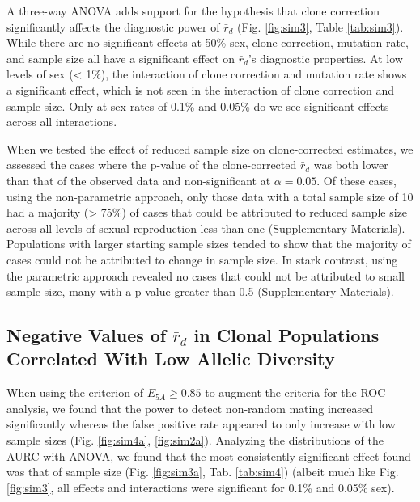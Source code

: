 \documentclass[]{article}
\theoremstyle{definition}
\theoremstyle{definition}
\theoremstyle{remark}
\begin{document}
A three-way ANOVA adds support for the hypothesis that clone correction
significantly affects the diagnostic power of \(\bar{r}_d\) (Fig.
\ref{fig:sim3}, Table \ref{tab:sim3}). While there are no significant
effects at 50\% sex, clone correction, mutation rate, and sample size
all have a significant effect on \(\bar{r}_d\)'s diagnostic properties.
At low levels of sex (\textless{} 1\%), the interaction of clone
correction and mutation rate shows a significant effect, which is not
seen in the interaction of clone correction and sample size. Only at sex
rates of 0.1\% and 0.05\% do we see significant effects across all
interactions.

When we tested the effect of reduced sample size on clone-corrected
estimates, we assessed the cases where the p-value of the
clone-corrected \(\bar{r}_d\) was both lower than that of the observed
data and non-significant at \(\alpha = 0.05\). Of these cases, using the
non-parametric approach, only those data with a total sample size of 10
had a majority (\textgreater{} 75\%) of cases that could be attributed
to reduced sample size across all levels of sexual reproduction less
than one (Supplementary Materials). Populations with larger starting
sample sizes tended to show that the majority of cases could not be
attributed to change in sample size. In stark contrast, using the
parametric approach revealed no cases that could not be attributed to
small sample size, many with a p-value greater than 0.5 (Supplementary
Materials).

\subsection{\texorpdfstring{Negative Values of \(\bar{r}_d\) in Clonal
Populations Correlated With Low Allelic
Diversity}{Negative Values of \textbackslash{}bar\{r\}\_d in Clonal Populations Correlated With Low Allelic Diversity}}\label{negative-values-of-barr_d-in-clonal-populations-correlated-with-low-allelic-diversity}

When using the criterion of \(E_{5A} \geq 0.85\) to augment the criteria
for the ROC analysis, we found that the power to detect non-random
mating increased significantly whereas the false positive rate appeared
to only increase with low sample sizes (Fig. \ref{fig:sim4a},
\ref{fig:sim2a}). Analyzing the distributions of the AURC with ANOVA, we
found that the most consistently significant effect found was that of
sample size (Fig. \ref{fig:sim3a}, Tab. \ref{tab:sim4}) (albeit much
like Fig. \ref{fig:sim3}, all effects and interactions were significant
for 0.1\% and 0.05\% sex).
\end{document}
